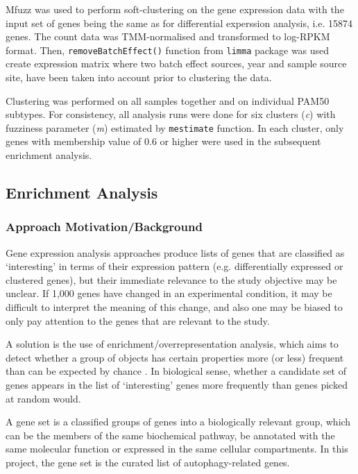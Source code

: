 Mfuzz was used to perform soft-clustering on the gene expression data with the input set of genes being the same as for differential experssion analysis, i.e. 15874 genes. The count data was TMM-normalised and transformed to log-RPKM format. Then, \texttt{removeBatchEffect()} function from \texttt{limma} package \cite{Ritchie2015LimmaStudies} was used create expression matrix where two batch effect sources, year and sample source site, have been taken into account prior to clustering the data. 

Clustering was performed on all samples together and on individual PAM50 subtypes. For consistency, all analysis runs were done for six clusters (\textit{c})  with fuzziness parameter (\textit{m}) estimated by \texttt{mestimate} function. In each cluster, only genes with membership value of 0.6 or higher were used in the subsequent enrichment analysis. 





    \newpage
    \subsection{Enrichment Analysis}
    
    
      \subsubsection{Approach Motivation/Background}
        Gene expression analysis approaches produce lists of genes that are classified as ‘interesting’ in terms of their expression pattern (e.g. differentially expressed or clustered genes), but their immediate relevance to the study objective may be unclear. If 1,000 genes have changed in an experimental condition, it may be difficult to interpret the meaning of this change, and also one may be biased to only pay attention to the genes that are relevant to the study. 

        A solution is the use of enrichment/overrepresentation analysis, which aims to detect whether a group of objects has certain properties more (or less) frequent than can be expected by chance \cite{Goeman2007AnalyzingIssues}. In biological sense, whether a candidate set of genes appears in the list of ‘interesting’ genes more frequently than genes picked at random would. 

        A gene set is a classified groups of genes into a biologically relevant group, which can be the members of the same biochemical pathway, be annotated with the same molecular function or expressed in the same cellular compartments. In this project, the gene set is the curated list of autophagy-related genes. 
        
